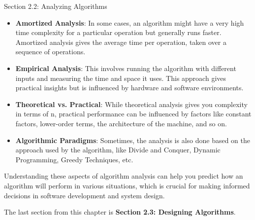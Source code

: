 \begin{notes}{Section 2.2: Analyzing Algorithms}
\begin{itemize}
        \item \textbf{Amortized Analysis}: In some cases, an algorithm might have a very high time complexity for a particular operation but generally runs faster. Amortized analysis gives the average 
        time per operation, taken over a sequence of operations.
        \item \textbf{Empirical Analysis}: This involves running the algorithm with different inputs and measuring the time and space it uses. This approach gives practical insights but is influenced 
        by hardware and software environments.
        \item \textbf{Theoretical vs. Practical}: While theoretical analysis gives you complexity in terms of n, practical performance can be influenced by factors like constant factors, lower-order 
        terms, the architecture of the machine, and so on.
        \item \textbf{Algorithmic Paradigms}: Sometimes, the analysis is also done based on the approach used by the algorithm, like Divide and Conquer, Dynamic Programming, Greedy Techniques, etc.
    \end{itemize}

    Understanding these aspects of algorithm analysis can help you predict how an algorithm will perform in various situations, which is crucial for making informed decisions in software development 
    and system design.
\end{notes}

The last section from this chapter is \textbf{Section 2.3: Designing Algorithms}.

